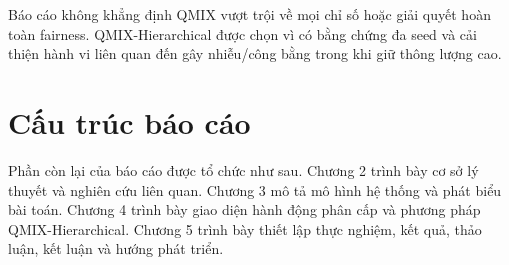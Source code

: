 Báo cáo không khẳng định QMIX vượt trội về mọi chỉ số hoặc giải quyết hoàn toàn fairness. QMIX-Hierarchical được chọn vì có bằng chứng đa seed và cải thiện hành vi liên quan đến gây nhiễu/công bằng trong khi giữ thông lượng cao.

\section{Cấu trúc báo cáo}

Phần còn lại của báo cáo được tổ chức như sau. Chương 2 trình bày cơ sở lý thuyết và nghiên cứu liên quan. Chương 3 mô tả mô hình hệ thống và phát biểu bài toán. Chương 4 trình bày giao diện hành động phân cấp và phương pháp QMIX-Hierarchical. Chương 5 trình bày thiết lập thực nghiệm, kết quả, thảo luận, kết luận và hướng phát triển.
